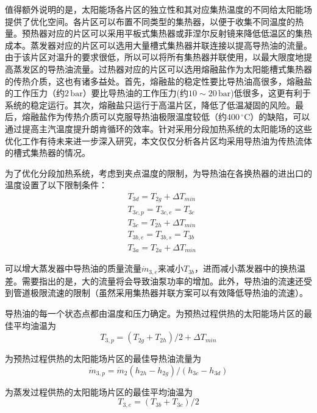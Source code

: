 值得额外说明的是，太阳能场各片区的独立性和其对应集热温度的不同给太阳能场提供了优化空间。各片区可以布置不同类型的集热器，以便于收集不同温度的热量。预热器对应的片区可以采用平板式集热器或菲涅尔反射镜来降低低温区的集热成本。蒸发器对应的片区可以选用大量槽式集热器并联连接以提高导热油的流量。由于该片区对温升的要求很低，所以可以将所有集热器并联使用，以最大限度地提高蒸发区的导热油流量。过热器对应的片区可以选用熔融盐作为太阳能槽式集热器的传热介质，这也有诸多益处。首先，熔融盐的稳定性要比导热油高很多，熔融盐的工作压力（约$2\,\mathrm{bar}$）要比导热油的工作压力(约$10\sim20\,\mathrm{bar}$)低很多，这更有利于系统的稳定运行。其次，熔融盐只运行于高温片区，降低了低温凝固的风险。最后，熔融盐作为传热介质可以克服导热油极限温度较低（约400$\,^\circ\mathrm{C}$）的缺陷，可以通过提高主汽温度提升朗肯循环的效率。针对采用分段加热系统的太阳能场的这些优化工作有待未来进一步深入研究，本文仅仅分析各片区均采用导热油为传热流体的槽式集热器的情况。

为了优化分段加热系统，考虑到夹点温度的限制，为导热油在各换热器的进出口的温度设置了以下限制条件：
\begin{eqnarray*}
	&T_{3d} = T_{2g} + \Delta T_{min}\\
   &T_{3c,p} = T_{3c,e} = T_{3c}\\
   &T_{3c} = T_{2h} + \Delta T_{min}\\
	&T_{3b,e} = T_{3b,s} = T_{3b}\\
	&T_{3a} = T_{2a} + \Delta T_{min}
\end{eqnarray*}

可以增大蒸发器中导热油的质量流量$\dot{m}_{3,e}$来减小$T_{3b}$，进而减小蒸发器中的换热温差。需要指出的是，大的流量将会导致油泵功率的增加。此外，导热油的流速还受到管道极限流速的限制（虽然采用集热器并联方案可以有效降低导热油的流速）。

导热油的每一个状态点都由温度和压力确定。为预热过程供热的太阳能场片区的最佳平均油温为
\begin{equation}
  T_{3,p} = (T_{2g} + T_{2h})/2 + \Delta T_{min}
\end{equation}

为预热过程供热的太阳能场片区的最佳导热油流量为
\begin{equation}
  \dot{m}_{3,p} = \dot{m}_{2}(h_{2h} - h_{2g})/(h_{3c} - h_{3d})
\end{equation}

为蒸发过程供热的太阳能场片区的最佳平均油温为
\begin{equation}
  T_{3,e} = (T_{3b} + T_{3c})/2
\end{equation}

